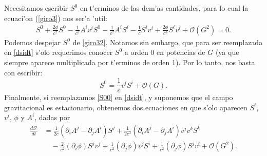 Necesitamos escribir $S^0$ en t'erminos de las dem'as cantidades, para lo cual la ecuaci'on (\ref{giro3}) nos ser'a 'util:
\begin{align}
S^0+\frac{2\phi}{c^2}S^0-\frac{1}{c^3}A^iv^iS^0-\frac{1}{c^2}A^iS^i-\frac{1}{c}S^iv^i 
+\frac{2\phi}{c^3}S^iv^i+\mathcal{O}(G^2)=0.\label{giro32}
\end{align}
Podemos despejar $S^0$ de \eqref{giro32}. Notamos sin embargo, que para ser reemplazada en \eqref{dsidt} s'olo requerimos conocer $S^0$ a orden 0 en potencias de $G$ (ya que siempre aparece multiplicada por t'erminos de orden 1). Por lo tanto, nos basta con escribir:
\begin{equation}
S^0=\frac{1}{c}v^iS^i +\mathcal{O}(G).\label{S00}
\end{equation}
Finalmente, si reemplazamos \eqref{S00} %
en \eqref{dsidt}, y suponemos que el campo gravitacional es estacionario, 
obtenemos dos ecuaciones en que s'olo aparecen $S^i$, $v^i$, $\phi$ y $A^i$, dadas por
\begin{align}
\frac{dS^{i}}{dt} &= \frac{1}{2c}\left(\partial_iA^j-\partial_jA^i\right)S^j + \frac{1}{2c^3}(\partial_iA^j-\partial_jA^i)v^jv^kS^k \nonumber \\
&\quad  -\frac{2}{c^2}(\partial_i\phi) S^jv^j+\frac{1}{c^2}(\partial_j\phi)v^jS^i+\frac{1}{c^2}(\partial_j\phi)S^jv^i+\mathcal{O}(G^2).\label{dsidt2}
\end{align}
